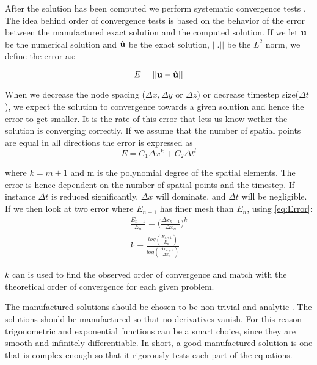 After the solution has been computed we perform systematic convergence tests \cite{Roache2002}. The idea behind order of convergence tests is based on the behavior of the error between the manufactured exact solution and the computed solution. 
If we let $\bold{u}$ be the numerical solution and $\hat{\bold{u}}$ be the exact solution, $|| . ||$ be the $L^2$ norm, we define the error as:

\begin{equation}
E = || \bold{u} - \hat{\bold{u}} ||
\end{equation}

When we decrease the node spacing ($ \Delta x, \Delta y$ or $ \Delta z$) or decrease timestep size($\Delta t$), we expect the solution to convergence towards a given solution and hence the error to get smaller. It is the rate of this error that lets us know wether the solution is converging correctly.
If we assume that the number of spatial points are equal in all directions the error is expressed as
\begin{equation}
\label{eq:Error}
 E = C_1 \Delta x^k+ C_2 \Delta t^l 
\end{equation}

where $ k = m+1 $ and m is the polynomial degree of the spatial elements. The error is hence dependent on the number of spatial points and the timestep.
If instance $\Delta t$ is reduced significantly, $\Delta x$ will dominate, and $\Delta t$ will be negligible. If we then look at two error where $E_{n+1}$ has finer mesh than $E_n$, using \eqref{eq:Error}:
\begin{align}
\frac{E_{n+1}}{E_n} = \big( \frac{\Delta x_{n+1}}{\Delta x_n} \big)^k \\
k = \frac{log( \frac{E_{n+1}}{E_n}) }{ log(\frac{\Delta x_{n+1}}{\Delta x_n})}
\end{align}

$k$ can is used to find the observed order of convergence and match with the theoretical order of convergence for each given problem.\newline

The manufactured solutions should be chosen to be non-trivial and analytic \cite{Oberkampf2010, Roache2002}. The solutions should be manufactured so that no derivatives vanish. For this reason trigonometric and exponential functions can be a smart choice, since they are smooth and infinitely differentiable. In short, a good manufactured solution is one that is complex enough so that it rigorously tests each part of the equations.\newline 

